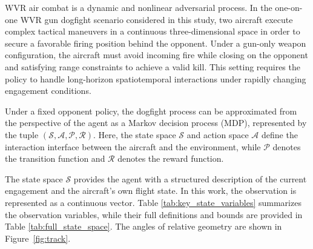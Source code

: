 \documentclass[pdflatex,sn-mathphys-num]{sn-jnl}%
\theoremstyle{thmstyleone}%
\theoremstyle{thmstyletwo}%
\theoremstyle{thmstylethree}%
\begin{document}
WVR air combat is a dynamic and nonlinear adversarial process. In the one-on-one WVR gun dogfight scenario considered in this study, two aircraft execute complex tactical maneuvers in a continuous three-dimensional space in order to secure a favorable firing position behind the opponent. Under a gun-only weapon configuration, the aircraft must avoid incoming fire while closing on the opponent and satisfying range constraints to achieve a valid kill. This setting requires the policy to handle long-horizon spatiotemporal interactions under rapidly changing engagement conditions.

Under a fixed opponent policy, the dogfight process can be approximated from the perspective of the agent as a Markov decision process (MDP), represented by the tuple $(\mathcal{S}, \mathcal{A}, \mathcal{P}, \mathcal{R})$. Here, the state space $\mathcal{S}$ and action space $\mathcal{A}$ define the interaction interface between the aircraft and the environment, while $\mathcal{P}$ denotes the transition function and $\mathcal{R}$ denotes the reward function.

The state space $\mathcal{S}$ provides the agent with a structured description of the current engagement and the aircraft's own flight state. In this work, the observation is represented as a continuous vector. Table \ref{tab:key_state_variables} summarizes the observation variables, while their full definitions and bounds are provided in Table \ref{tab:full_state_space}. The angles of relative geometry are shown in Figure~\ref{fig:track}.
\end{document}
